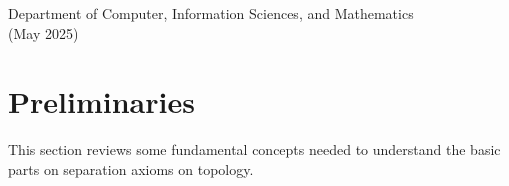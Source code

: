 \documentclass[12pt]{article} %
\begin{document}
{\normalsize Department of Computer, Information Sciences, and Mathematics} \\
{\small (May 2025)} \\
\endgroup










\pagestyle{empty} %
\newpage
\tableofcontents %


\pagestyle{fancy} %


\newpage
\section{Preliminaries}
This section reviews some fundamental concepts needed to understand the basic parts on separation axioms on topology. 
\end{document}
